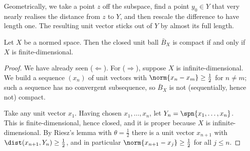 Geometrically, we take a point $z$ off the subspace, find a point $y_0 \in Y$ that very nearly realises the distance from $z$ to $Y$, and then rescale the difference to have length one. The resulting unit vector sticks out of $Y$ by almost its full length.

\begin{center}
\end{center}

\begin{theorem}[Riesz]
	Let $X$ be a normed space. Then the closed unit ball $\bar{B}_X$ is compact if and only if $X$ is finite-dimensional.
\end{theorem}

\begin{proof}
	We have already seen ($\Leftarrow$). For ($\Rightarrow$), suppose $X$ is infinite-dimensional. We build a sequence $(x_n)$ of unit vectors with $\norm{x_n - x_m} \geq \frac12$ for $n \neq m$; such a sequence has no convergent subsequence, so $\bar{B}_X$ is not (sequentially, hence not) compact.

	Take any unit vector $x_1$. Having chosen $x_1, \dots, x_n$, let $Y_n = \spn\{x_1, \dots, x_n\}$. This is finite-dimensional, hence closed, and it is proper because $X$ is infinite-dimensional. By Riesz's lemma with $\theta = \frac12$ there is a unit vector $x_{n+1}$ with $\dist(x_{n+1}, Y_n) \geq \frac12$, and in particular $\norm{x_{n+1} - x_j} \geq \frac12$ for all $j \leq n$.
\end{proof}

